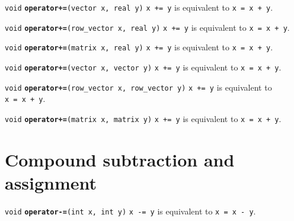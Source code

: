 \documentclass[
  10pt,
]{book}
\begin{document}
\texttt{void} \textbf{\texttt{operator+=}}\texttt{(vector\ x,\ real\ y)}\newline
\texttt{x\ +=\ y} is equivalent to \texttt{x\ =\ x\ +\ y}.


\texttt{void} \textbf{\texttt{operator+=}}\texttt{(row\_vector\ x,\ real\ y)}\newline
\texttt{x\ +=\ y} is equivalent to \texttt{x\ =\ x\ +\ y}.


\texttt{void} \textbf{\texttt{operator+=}}\texttt{(matrix\ x,\ real\ y)}\newline
\texttt{x\ +=\ y} is equivalent to \texttt{x\ =\ x\ +\ y}.


\texttt{void} \textbf{\texttt{operator+=}}\texttt{(vector\ x,\ vector\ y)}\newline
\texttt{x\ +=\ y} is equivalent to \texttt{x\ =\ x\ +\ y}.


\texttt{void} \textbf{\texttt{operator+=}}\texttt{(row\_vector\ x,\ row\_vector\ y)}\newline
\texttt{x\ +=\ y} is equivalent to \texttt{x\ =\ x\ +\ y}.


\texttt{void} \textbf{\texttt{operator+=}}\texttt{(matrix\ x,\ matrix\ y)}\newline
\texttt{x\ +=\ y} is equivalent to \texttt{x\ =\ x\ +\ y}.

\hypertarget{compound-subtraction-and-assignment}{%
\section{Compound subtraction and assignment}\label{compound-subtraction-and-assignment}}


\texttt{void} \textbf{\texttt{operator-=}}\texttt{(int\ x,\ int\ y)}\newline
\texttt{x\ -=\ y} is equivalent to \texttt{x\ =\ x\ -\ y}.
\end{document}
